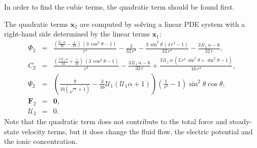 \documentclass[final]{elsarticle}
\newcommand{\pars}[1]{\left(#1\right)}
\newcommand\bF{\boldsymbol{F}}
\newcommand\bx{\boldsymbol{x}}
\newcommand\bzero{\boldsymbol{0}}
\newcommand\cU{\mathscr{U}}
\begin{document}
\begin{appendix}
In order to find the cubic terms, the quadratic term should be found first.

The quadratic terms $\bx_2$ are computed by solving a linear PDE system 
with a right-hand side determined by the linear terms $\bx_1$:
\begin{eqnarray*}
\varPhi_2 &=& \frac{\left(\frac{\cU_1\, \alpha}{32} - \frac{1}{16}\right)\, \left(3\, {\cos^2\theta} - 1\right)}{r^3} - \frac{3}{32\, r^4} - \frac{3\, {\sin^2\theta}\, \left(4\, r^3 - 1\right)}{32\, r^4} - \frac{3\, \cU_1\, \alpha - 6}{32\, r},
\\
C_2 &=& \frac{\left(\frac{5\, \cU_1\, \alpha}{32} + \frac{1}{16}\right)\, \left(3\, {\cos^2\theta} - 1\right)}{r^3} - \frac{3\, \cU_1\, \alpha - 6}{32\, r} + \frac{3\, \cU_1\, \alpha\, \left(2\, r^3\, {\sin^2\theta} + {\sin^2\theta} - 1\right)}{16\, r^4},
\\
\Psi_2 &=& \pars{\frac{9}{16(\sqrt{\gamma}+1)} - \frac{3}{16} \cU_1 (\cU_1 \alpha + 1)}
 \left(\frac{1}{r^2} - 1\right) \sin^2\theta \cos\theta,  \\
\bF_2 &=& \bzero, \\ \cU_2 &=& 0.
\end{eqnarray*}
Note that the quadratic term does not contribute to the total force and steady-state 
velocity terms, but it does change the fluid flow, 
the electric potential and the ionic concentration.


\end{appendix}
\end{document}
